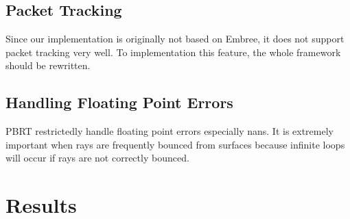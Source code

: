 \documentclass[acmtog]{acmart}
\begin{document}
\subsection{Packet Tracking}
    Since our implementation is originally not based on Embree, it does not support packet tracking very well.
    To implementation this feature, the whole framework should be rewritten.
\subsection{Handling Floating Point Errors}
    PBRT restrictedly handle floating point errors especially nans.
    It is extremely important when rays are frequently bounced from surfaces
    because infinite loops will occur if rays are not correctly bounced.

\section{Results}
\end{document}
